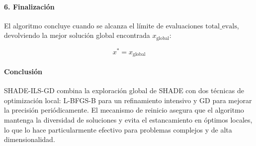 \paragraph{6. Finalización\\}

El algoritmo concluye cuando se alcanza el límite de evaluaciones $\text{total\_evals}$, devolviendo la mejor solución global encontrada $x_{\text{global}}$:

\begin{equation*}
    x^* = x_{\text{global}}
\end{equation*}

\paragraph{Conclusión\\}

SHADE-ILS-GD combina la exploración global de SHADE con dos técnicas de optimización local: L-BFGS-B para un refinamiento intensivo y GD para mejorar la precisión periódicamente. El mecanismo de reinicio asegura que el algoritmo mantenga la diversidad de soluciones y evita el estancamiento en óptimos locales, lo que lo hace particularmente efectivo para problemas complejos y de alta dimensionalidad.


